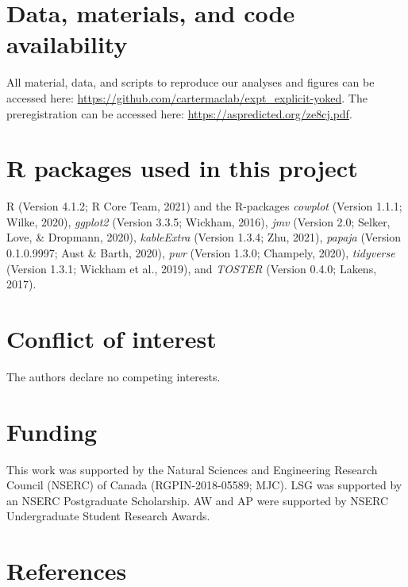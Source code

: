 \documentclass[
  english,
  man, donotrepeattitle,floatsintext]{apa7}
\begin{document}
\hypertarget{data-materials-and-code-availability}{%
\section{Data, materials, and code availability}\label{data-materials-and-code-availability}}

\label{sec:sharing}
All material, data, and scripts to reproduce our analyses and figures can be accessed here: \url{https://github.com/cartermaclab/expt_explicit-yoked}. The preregistration can be accessed here: \url{https://aspredicted.org/ze8cj.pdf}.

\hypertarget{r-packages-used-in-this-project}{%
\section{R packages used in this project}\label{r-packages-used-in-this-project}}

R (Version 4.1.2; R Core Team, 2021) and the R-packages \emph{cowplot} (Version 1.1.1; Wilke, 2020), \emph{ggplot2} (Version 3.3.5; Wickham, 2016), \emph{jmv} (Version 2.0; Selker, Love, \& Dropmann, 2020), \emph{kableExtra} (Version 1.3.4; Zhu, 2021), \emph{papaja} (Version 0.1.0.9997; Aust \& Barth, 2020), \emph{pwr} (Version 1.3.0; Champely, 2020), \emph{tidyverse} (Version 1.3.1; Wickham et al., 2019), and \emph{TOSTER} (Version 0.4.0; Lakens, 2017).

\hypertarget{conflict-of-interest}{%
\section{Conflict of interest}\label{conflict-of-interest}}

The authors declare no competing interests.

\hypertarget{funding}{%
\section{Funding}\label{funding}}

This work was supported by the Natural Sciences and Engineering Research Council (NSERC) of Canada (RGPIN-2018-05589; MJC). LSG was supported by an NSERC Postgraduate Scholarship. AW and AP were supported by NSERC Undergraduate Student Research Awards.

\hypertarget{references}{%
\section{References}\label{references}}
\end{document}
